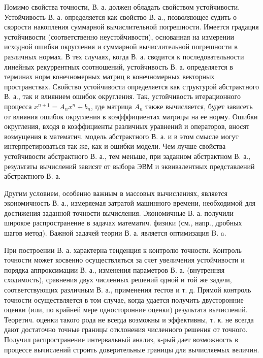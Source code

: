 \documentclass[10pt]{article}
\begin{document}
Помимо свойства точности, В. а. должен обладать свойством устойчивости. Устойчивость В. а. определяется как свойство В. а., позволяющее судить о скорости накопления суммарной вычислительной погрешности. Имеется градация устойчивости (соответственно неустойчивости), основанная на измерении исходной ошибки округления и суммарной вычислительной погрешности в различных нормах. В тех случаях, когда В. а. сводится к последовательности линейных рекуррентных соотношений, устойчивость В. а. определяется в терминах норм конечномерных матриц в конечномерных векторных пространствах. Свойство устойчивости определяется как структурой абстрактного В. а., так и влиянием ошибок округления. Так, устойчивость итерационного процесса $x^{n+1}=A_{n} x^{n}+b_{n}$, где матрица $A_{n}$ также вычисляется, будет зависеть от влияния ошибок округления в коэфффициентах матрицы на ее норму. Ошибки округления, входя в коэффициенты различных уравнений и операторов, вносят возмущения в математич. модель абстрактного В. а. и в этом смысле могут интерпретироваться так же, как и ошибки модели. Чем лучше свойства устойчивости абстрактного В. а., тем меньше, при заданном абстрактном В. а., результаты вычислений зависят от выбора ЭВМ и эквивалентных представлений абстрактного В. а.



Другим условием, особенно важным в массовых вычислениях, является экономичность В. а., измеряемая затратой машинного времени, необходимой для достижения заданной точности вычисления. Экономичные В. а. получили широкое распространение в задачах математич. физики (см., напр., дробных шагов метод). Важной задачей теории В. а. является оптимизация B. a.



При построении В. а. характерна тенденция к контролю точности. Контроль точности может косвенно осуществляться за счет увеличения устойчивости и порядка аппроксимации В. а., изменения параметров В. а. (внутренняя сходимость), сравнения двух численных решений одной и той же задачи, соответствующих различным В. а., применения тестов и т. д. Прямой контроль точности осуществляется в том случае, когда удается получить двусторонние оценки (или, по крайней мере односторонние оценки) результата вычислений. Теоретич. оценки такого рода не всегда возможны и эффективны, т. к. не всегда дают достаточно точные границы отклонения численного решения от точного. Получил распространение интервальный анализ, к-рый дает возможность в процессе вычислений строить доверительные границы для вычисляемых величин.
\end{document}
